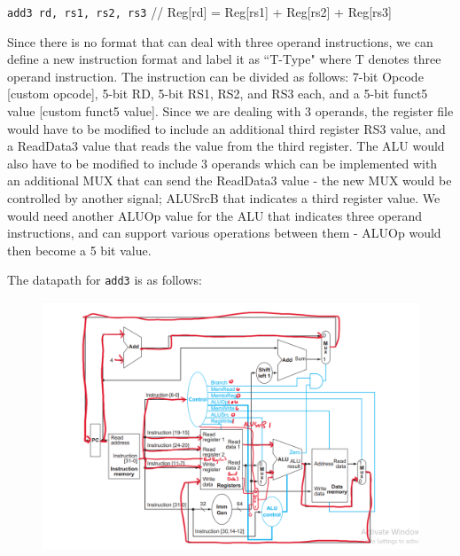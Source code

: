 \documentclass[addpoints]{exam}
\begin{document}
\begin{sloppypar}
\begin{questions}
\begin{solution}
\begin{parts}
            \texttt{add3 rd, rs1, rs2, rs3} \hspace*{5mm} // Reg[rd] = Reg[rs1] + Reg[rs2] + Reg[rs3]
            \begin{subparts}
                \renewcommand{\thesubpart}{\alph{subpart}}
                \subpart Since there is no format that can deal with three operand instructions, we can define a new instruction format and label it as ``T-Type" where T denotes three operand instruction. The instruction can be divided as follows: 7-bit Opcode [custom opcode], 5-bit RD, 5-bit RS1, RS2, and RS3 each, and a 5-bit funct5 value [custom funct5 value].
                \subpart Since we are dealing with 3 operands, the register file would have to be modified to include an additional third register RS3 value, and a ReadData3 value that reads the value from the third register. The ALU would also have to be modified to include 3 operands which can be implemented with an additional MUX that can send the ReadData3 value - the new MUX would be controlled by another signal; ALUSrcB that indicates a third register value. We would need another ALUOp value for the ALU that indicates three operand instructions, and can support various operations between them - ALUOp would then become a 5 bit value. 

                The datapath for \texttt{add3} is as follows:
                \begin{figure}[H]
                    \centering
                    \includegraphics[scale = 0.5]{Q7_b_add3.png}                    
                \end{figure}


\end{subparts}
\end{parts}
\end{solution}
\end{questions}
\end{sloppypar}
\end{document}
